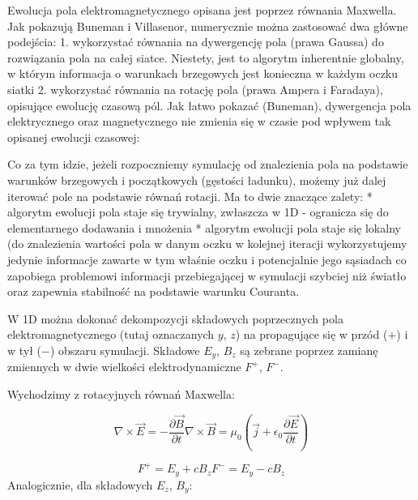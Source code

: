     Ewolucja pola elektromagnetycznego opisana jest poprzez równania Maxwella. Jak pokazują Buneman i Villasenor,
    numerycznie można zastosować dwa główne podejścia: %
    1. wykorzystać równania na dywergencję pola (prawa Gaussa) do rozwiązania pola na całej siatce. Niestety, jest to
    algorytm inherentnie globalny, w którym informacja o warunkach brzegowych jest konieczna w każdym oczku siatki
    2. wykorzystać równania na rotację pola (prawa Ampera i Faradaya), opisujące ewolucję czasową pól. Jak łatwo pokazać (Buneman),
    dywergencja pola elektrycznego oraz magnetycznego nie zmienia się w czasie pod wpływem tak opisanej ewolucji czasowej:

    Co za tym idzie, jeżeli rozpoczniemy symulację od znalezienia pola na podstawie warunków brzegowych i początkowych (gęstości
    ładunku), możemy już dalej iterować pole na podstawie równań rotacji. Ma to dwie znaczące zalety:
    * algorytm ewolucji pola staje się trywialny, zwłaszcza w 1D - ogranicza się do elementarnego dodawania i mnożenia %
    * algorytm ewolucji pola staje się lokalny (do znalezienia wartości pola w danym oczku w kolejnej iteracji wykorzystujemy
    jedynie informacje zawarte w tym właśnie oczku i potencjalnie jego sąsiadach %
    co zapobiega problemowi informacji przebiegającej w symulacji szybciej niż światło oraz zapewnia stabilność na podstawie
    warunku Couranta.

    W 1D można dokonać dekompozycji składowych poprzecznych pola elektromagnetycznego (tutaj oznaczanych $y$, $z$) na
    propagujące się w przód ($+$) i w tył ($-$) obszaru symulacji. Składowe $E_y$, $B_z$ są zebrane poprzez zamianę zmiennych
    w dwie wielkości elektrodynamiczne $F^+$, $F^-$.

    Wychodzimy z rotacyjnych równań Maxwella:

    \begin{equation}
        \nabla \times \vec{E} = -\frac{\partial \vec{B}}{\partial t}
        \nabla \times \vec{B} = \mu_0 (\vec{j} + \epsilon_0 \frac{\partial \vec{E}}{\partial t})
        \label{eqn:Maxwell-rotation-derivation}
    \end{equation}


    \begin{equation}
        F^{+} = E_y + c B_z
        F^{-} = E_y - c B_z
        \label{eqn:Birdsall-electromagnetic-quantities}
    \end{equation}
    Analogicznie, dla składowych $E_z$, $B_y$:

